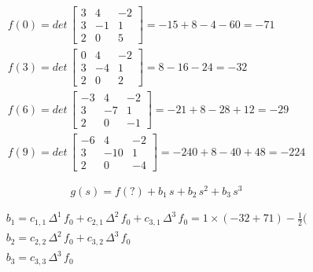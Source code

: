 \begin{itemize}
\begin{itemize}
\[
\begin{array}{l}
 f(0) = det \,
 \left[
 \begin{array}{ccc}
  3 & 4 & -2\\
  3 & -1 & 1\\
  2 & 0 & 5
 \end{array}
 \right]
 = - 15 + 8 - 4 - 60 = -71\\
 f(3) = det \,
 \left[
 \begin{array}{ccc}
  0 & 4 & -2\\
  3 & -4 & 1\\
  2 & 0 & 2
 \end{array}
 \right]
 = 8 - 16 - 24 = -32\\
 f(6) = det \,
 \left[
 \begin{array}{ccc}
  -3 & 4 & -2\\
  3 & -7 & 1\\
  2 & 0 & -1
 \end{array}
 \right]
 = -21 + 8 - 28 + 12 = -29\\
 f(9) = det \,
 \left[
 \begin{array}{ccc}
  -6 & 4 & -2\\
  3 & -10 & 1\\
  2 & 0 & -4
 \end{array}
 \right]
 = -240 + 8 - 40 + 48 = -224
\end{array}
\]

\[
 g(s) = f(?) + b_1 \, s + b_2 \, s^2 + b_3 \, s^3
\]

\[
 \begin{array}{l}
  b_1 = c_{1,1} \, \Delta^1 \, f_0 + c_{2,1} \, \Delta^2 \, f_0 + c_{3,1} \, \Delta^3 \, f_0 = 1 \times (-32 + 71) - \frac{1}{2} (\\
  b_2 = c_{2,2} \, \Delta^2 \, f_0 + c_{3,2} \, \Delta^3 \, f_0\\
  b_3 = c_{3,3} \, \Delta^3 \, f_0
 \end{array}
\]

\end{itemize}

\end{itemize}

